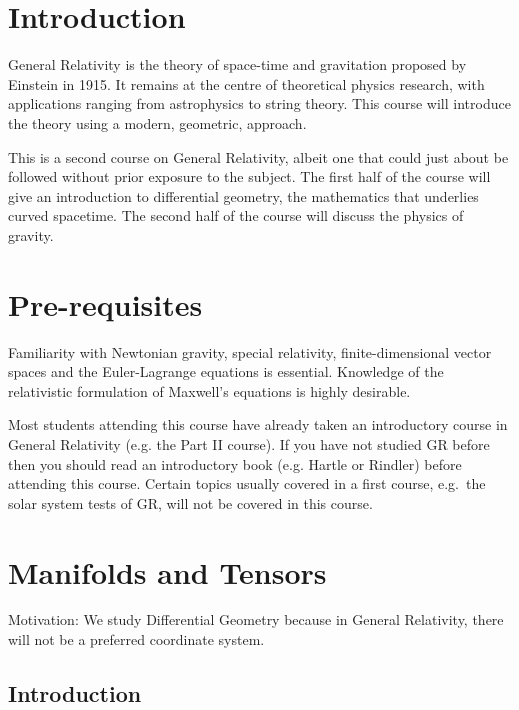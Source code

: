 \documentclass[a4paper,11pt]{article}
\begin{document}
	\maketitlepage

	\preliminaries

	\section*{Introduction}

	\noindent General Relativity is the theory of space-time and gravitation proposed by Einstein in 1915. It remains at the centre of theoretical physics research, with applications ranging from astrophysics to string theory. This course will introduce the theory using a modern, geometric, approach.
	
	\noindent This is a second course on General Relativity, albeit one that could just about be followed without prior exposure to the subject. The first half of the course will give an introduction to differential geometry, the mathematics that underlies curved spacetime. The second half of the course will discuss the physics of gravity.

	\section*{Pre-requisites}
	
	\noindent Familiarity with Newtonian gravity, special relativity, finite-dimensional vector spaces and the Euler-Lagrange equations is essential. Knowledge of the relativistic formulation of Maxwell’s equations is highly desirable.
	
	\noindent Most students attending this course have already taken an introductory course in General Relativity (e.g. the Part II course). If you have not studied GR before then you should read an introductory book (e.g. Hartle or Rindler) before attending this course. Certain topics usually covered in a first course, e.g.\ the solar system tests of GR, will not be covered in this course.

	\newpage
	\tableofcontents
	\newpage
	\maintext
	
	\section{Manifolds and Tensors}

	Motivation: We study Differential Geometry because in General Relativity, there will not be a preferred coordinate system.

	\subsection{Introduction}
\end{document}

